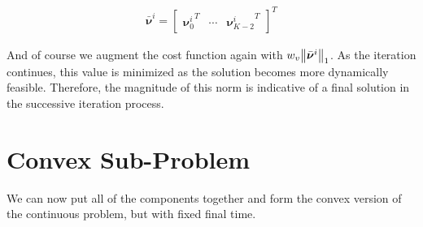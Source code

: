 \begin{align}
\bar{\bm{\nu}}^i = 
	\begin{bmatrix}
	{\bm{\nu}_0^i}^T & \cdots & {\bm{\nu}^i_{K-2}}^T 
	\end{bmatrix}^T
\end{align}

And of course we augment the cost function again with $w_v \norm{\bar{\bm{\nu}}^i}_1$. As the iteration continues, this value is minimized as the solution becomes more dynamically feasible. Therefore, the magnitude of this norm is indicative of a final solution in the successive iteration process.

\section{Convex Sub-Problem}
We can now put all of the components together and form the convex version of the continuous problem, but with fixed final time.

